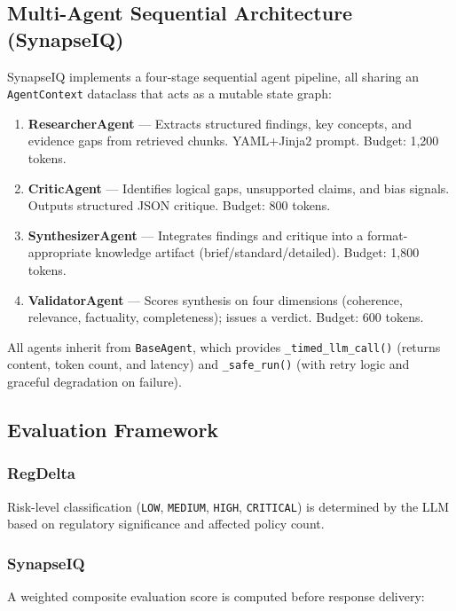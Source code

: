 \documentclass[12pt,letterpaper]{article}
\begin{document}
\subsection{Multi-Agent Sequential Architecture (SynapseIQ)}

SynapseIQ implements a four-stage sequential agent pipeline, all sharing an
\texttt{AgentContext} dataclass that acts as a mutable state graph:

\begin{enumerate}[leftmargin=2em]
  \item \textbf{ResearcherAgent} --- Extracts structured findings, key concepts, and
        evidence gaps from retrieved chunks. YAML+Jinja2 prompt. Budget: 1,200 tokens.

  \item \textbf{CriticAgent} --- Identifies logical gaps, unsupported claims, and bias
        signals. Outputs structured JSON critique. Budget: 800 tokens.

  \item \textbf{SynthesizerAgent} --- Integrates findings and critique into a
        format-appropriate knowledge artifact (brief/standard/detailed).
        Budget: 1,800 tokens.

  \item \textbf{ValidatorAgent} --- Scores synthesis on four dimensions (coherence,
        relevance, factuality, completeness); issues a verdict. Budget: 600 tokens.
\end{enumerate}

All agents inherit from \texttt{BaseAgent}, which provides \texttt{\_timed\_llm\_call()}
(returns content, token count, and latency) and \texttt{\_safe\_run()} (with retry logic
and graceful degradation on failure).

\subsection{Evaluation Framework}

\subsubsection*{RegDelta}
Risk-level classification (\texttt{LOW}, \texttt{MEDIUM}, \texttt{HIGH}, \texttt{CRITICAL})
is determined by the LLM based on regulatory significance and affected policy count.

\subsubsection*{SynapseIQ}
A weighted composite evaluation score is computed before response delivery:
\end{document}
